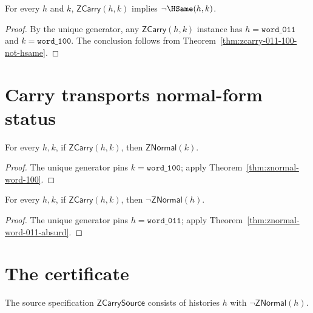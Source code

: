\begin{theorem}
\label{thm:zcarry-not-hsame}
For every \(h\) and \(k\), \(\mathsf{ZCarry}(h, k)\) implies \(\neg \HSame(h, k)\).
\end{theorem}
\begin{proof}
By the unique generator, any \(\mathsf{ZCarry}(h, k)\) instance has \(h = \mathtt{word\_011}\) and \(k = \mathtt{word\_100}\). The conclusion follows from Theorem~\ref{thm:zcarry-011-100-not-hsame}.
\end{proof}

\section{Carry transports normal-form status}

\begin{theorem}
\label{thm:zcarry-target-normal}
For every \(h, k\), if \(\mathsf{ZCarry}(h, k)\), then \(\mathsf{ZNormal}(k)\).
\end{theorem}
\begin{proof}
The unique generator pins \(k = \mathtt{word\_100}\); apply Theorem~\ref{thm:znormal-word-100}.
\end{proof}

\begin{theorem}
\label{thm:zcarry-source-not-normal}
For every \(h, k\), if \(\mathsf{ZCarry}(h, k)\), then \(\neg \mathsf{ZNormal}(h)\).
\end{theorem}
\begin{proof}
The unique generator pins \(h = \mathtt{word\_011}\); apply Theorem~\ref{thm:znormal-word-011-absurd}.
\end{proof}

\section{The certificate}

\begin{definition}
\label{def:zcarry-source-specification}
The source specification \(\mathsf{ZCarrySource}\) consists of histories \(h\) with \(\neg \mathsf{ZNormal}(h)\).
\end{definition}

